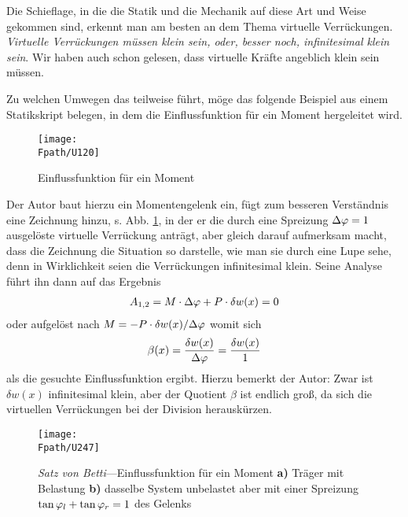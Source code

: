 Die Schieflage,  in die die Statik und die Mechanik auf diese Art und Weise gekommen sind, erkennt man am besten an dem Thema virtuelle Verr\"{u}ckungen. {\em \glq Virtuelle Verr\"{u}ckungen m\"{u}ssen klein sein, oder, besser noch, infinitesimal klein sein\grq{}\/}. Wir haben auch schon gelesen, dass virtuelle Kr\"{a}fte angeblich klein sein m\"{u}ssen.

Zu welchen \glq Umwegen\grq{} das teilweise f\"{u}hrt, m\"{o}ge das folgende Beispiel aus einem Statikskript belegen, in dem die Einflussfunktion f\"{u}r ein Moment hergeleitet wird.
\begin{figure}[tbp]
\centering
\if {} \sidecaption \fi
\texttt{[image: \\Fpath/U120]}
\caption{Einflussfunktion f\"{u}r ein Moment} \label{U120}
\end{figure}%

Der Autor baut hierzu ein Momentengelenk ein, f\"{u}gt zum besseren Verst\"{a}ndnis eine Zeichnung hinzu, s. Abb. \ref{U120}, in der er die durch eine  Spreizung \glq $\Delta \varphi = 1$\grq{} ausgel\"{o}ste virtuelle Verr\"{u}ckung antr\"{a}gt, aber gleich darauf aufmerksam macht, dass die Zeichnung die Situation so darstelle, \glq wie man sie durch eine Lupe\grq{} sehe, denn in Wirklichkeit seien die Verr\"{u}ckungen infinitesimal klein. Seine Analyse f\"{u}hrt ihn dann auf das Ergebnis
\begin{align}
A_{1,2} = M \cdot \Delta \varphi + P\cdot \delta w(x) = 0
\end{align}
oder aufgel\"{o}st nach $M = - P \cdot \delta w(x)/\Delta \varphi$
womit sich
\begin{align}
\beta(x) = \frac{\delta w(x)}{\Delta \varphi} = \frac{\delta w(x)}{1}
\end{align}
als die gesuchte Einflussfunktion ergibt. Hierzu bemerkt der Autor: \glq Zwar ist $\delta w(x)$ infinitesimal klein, aber der Quotient $\beta$ ist endlich gro{\ss}, da sich die virtuellen Verr\"{u}ckungen bei der Division herausk\"{u}rzen.\grq{}
\begin{figure}[tbp]
\centering
\if {} \sidecaption \fi
\texttt{[image: \\Fpath/U247]}
\caption{{\em Satz von Betti\/}---Einflussfunktion f\"{u}r ein Moment \textbf{ a)} Tr\"{a}ger mit Belastung \textbf{ b)} dasselbe System unbelastet aber mit einer Spreizung $\tan \varphi_l + \tan \varphi_r = 1$ des Gelenks} \label{U247A}
\end{figure}%

